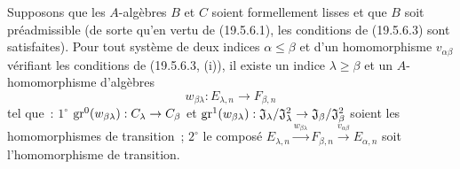 \begin{lemma}[19.5.6.5]
\label{0.19.5.6.5-fr}
Supposons que les $A$-algèbres $B$ et $C$ soient formellement lisses et que
$B$ soit préadmissible (de sorte qu'en vertu de (19.5.6.1), les conditions de
(19.5.6.3) sont satisfaites). Pour tout système de deux indices
$\alpha\leq\beta$ et d'un homomorphisme $v_{\alpha\beta}$ vérifiant les
conditions de (19.5.6.3, (i)), il existe un indice $\lambda\geq\beta$ et un
$A$-homomorphisme d'algèbres
\[
  w_{\beta\lambda}:E_{\lambda,n}\longrightarrow F_{\beta,n}
\]
tel que~: $1^\circ$ $\operatorname{gr}^0(w_{\beta\lambda}):C_\lambda\to C_\beta$ et
$\operatorname{gr}^1(w_{\beta\lambda}):
\mathfrak J_\lambda/\mathfrak J_\lambda^2\to
\mathfrak J_\beta/\mathfrak J_\beta^2$ soient les homomorphismes de
transition~; $2^\circ$ le composé
$E_{\lambda,n}\xrightarrow{w_{\beta\lambda}}F_{\beta,n}
\xrightarrow{v_{\alpha\beta}}E_{\alpha,n}$ soit l'homomorphisme de transition.
\end{lemma}

